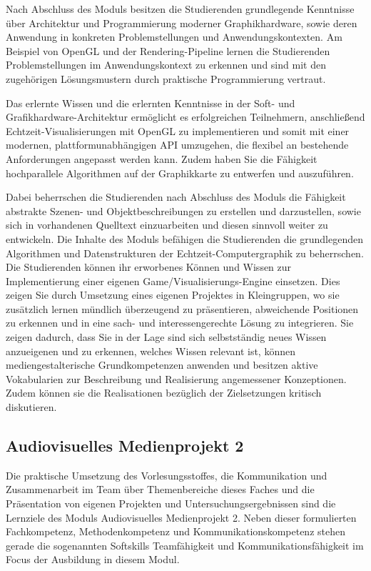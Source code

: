 Nach Abschluss des Moduls besitzen die Studierenden grundlegende
Kenntnisse über Architektur und Programmierung moderner Graphikhardware,
sowie deren Anwendung in konkreten Problemstellungen und
Anwendungskontexten. Am Beispiel von OpenGL und der Rendering-Pipeline
lernen die Studierenden Problemstellungen im Anwendungskontext zu
erkennen und sind mit den zugehörigen Lösungsmustern durch praktische
Programmierung vertraut.

Das erlernte Wissen und die erlernten Kenntnisse in der Soft- und
Grafikhardware-Architektur ermöglicht es erfolgreichen Teilnehmern,
anschließend Echtzeit-Visualisierungen mit OpenGL zu implementieren und
somit mit einer modernen, plattformunabhängigen API umzugehen, die
flexibel an bestehende Anforderungen angepasst werden kann. Zudem haben
Sie die Fähigkeit hochparallele Algorithmen auf der Graphikkarte zu
entwerfen und auszuführen.

Dabei beherrschen die Studierenden nach Abschluss des Moduls die
Fähigkeit abstrakte Szenen- und Objektbeschreibungen zu erstellen und
darzustellen, sowie sich in vorhandenen Quelltext einzuarbeiten und
diesen sinnvoll weiter zu entwickeln. Die Inhalte des Moduls befähigen
die Studierenden die grundlegenden Algorithmen und Datenstrukturen der
Echtzeit-Computergraphik zu beherrschen. Die Studierenden können ihr
erworbenes Können und Wissen zur Implementierung einer eigenen
Game/Visualisierungs-Engine einsetzen. Dies zeigen Sie durch Umsetzung
eines eigenen Projektes in Kleingruppen, wo sie zusätzlich lernen
mündlich überzeugend zu präsentieren, abweichende Positionen zu erkennen
und in eine sach- und interessengerechte Lösung zu integrieren. Sie
zeigen dadurch, dass Sie in der Lage sind sich selbstständig neues
Wissen anzueigenen und zu erkennen, welches Wissen relevant ist, können
mediengestalterische Grundkompetenzen anwenden und besitzen aktive
Vokabularien zur Beschreibung und Realisierung angemessener
Konzeptionen. Zudem können sie die Realisationen bezüglich der
Zielsetzungen kritisch diskutieren.

\subsection{Audiovisuelles Medienprojekt
2}\label{audiovisuelles-medienprojekt-2}

Die praktische Umsetzung des Vorlesungsstoffes, die Kommunikation und
Zusammenarbeit im Team über Themenbereiche dieses Faches und die
Präsentation von eigenen Projekten und Untersuchungsergebnissen sind die
Lernziele des Moduls Audiovisuelles Medienprojekt 2. Neben dieser
formulierten Fachkompetenz, Methodenkompetenz und
Kommunikationskompetenz stehen gerade die sogenannten Softskills
Teamfähigkeit und Kommunikationsfähigkeit im Focus der Ausbildung in
diesem Modul.


